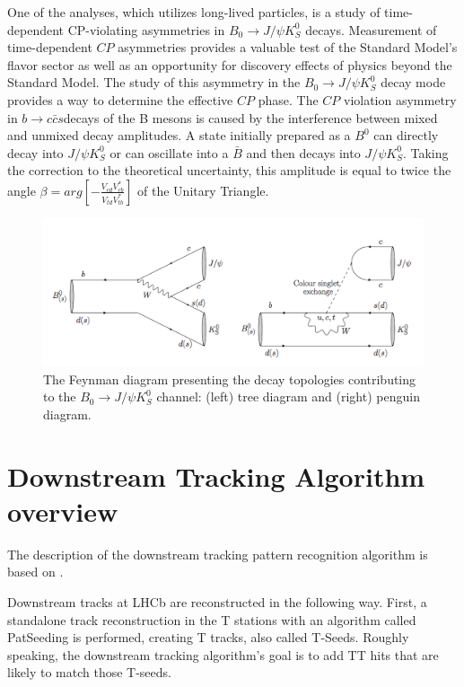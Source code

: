 One of the analyses, which utilizes long-lived particles, is a study of time-dependent CP-violating asymmetries in $B_0 \rightarrow J/\psi K_S^0 $ decays. Measurement of time-dependent $CP$ asymmetries provides a valuable test of the Standard Model's flavor sector as well as an opportunity for discovery effects of physics beyond the Standard Model.  
 The study of this asymmetry in the $B_0 \rightarrow J/\psi K_S^0 $  decay mode provides a way to determine the effective $CP$ phase. The $CP$ violation asymmetry in $b \rightarrow c\bar{c}s$decays of the B mesons is caused by the interference between mixed and unmixed decay amplitudes.
 A state initially prepared as a $B^0$ can directly decay into $J/\psi K_S^0$ or can oscillate into a $\bar{B}$ and then decays into  $J/\psi K_S^0$. Taking the correction to the theoretical uncertainty, this amplitude is equal to twice the angle $\beta = arg [ -  \frac{V_{cd}V_{cb}^*}{V_{td}V_{tb}^*} ] $ of the Unitary Triangle. 


\begin{figure}[h]
\centering
\includegraphics[scale=0.9]{figures/B0JPKs.png}
\caption{The Feynman diagram presenting the decay topologies contributing to the $B_0 \rightarrow J/\psi K_S^0 $ channel:  (left) tree diagram and (right) penguin diagram.
\label{fig:BJPSi}}
\end{figure}

\section{Downstream Tracking Algorithm overview}
\label{Sec:Downstrean Overview}
The description of the downstream tracking pattern recognition algorithm is based on \cite{patllt}. 

Downstream tracks at LHCb are reconstructed in the following way. First, a standalone track reconstruction in the T stations with an algorithm called PatSeeding is performed, creating T tracks, also called T-Seeds. 
Roughly speaking, the downstream tracking algorithm's goal is to add TT hits that are likely to match those T-seeds. 

